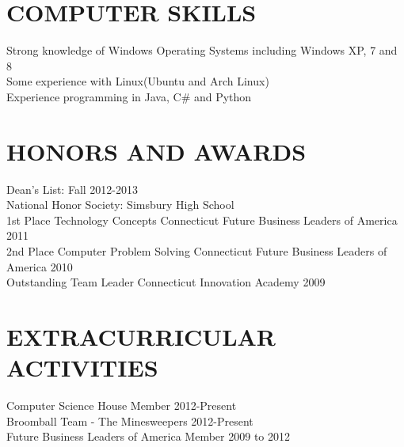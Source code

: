 \documentclass{res}
\begin{document}
\begin{resume}
\section{COMPUTER SKILLS}   
    \vspace{2pt}       
    Strong knowledge of Windows Operating Systems including Windows XP, 7 and 8\\
    Some experience with Linux(Ubuntu and Arch Linux) \\
    Experience programming in Java, C\# and Python\\
     
\section{HONORS AND AWARDS}          
    \vspace{2pt}
    Dean's List: Fall 2012-2013  \\        
    National Honor Society: Simsbury High School  \\        
    1st Place Technology Concepts Connecticut Future Business Leaders of America  2011\\        
    2nd Place Computer Problem Solving Connecticut Future Business Leaders of America 2010\\
    Outstanding Team Leader Connecticut Innovation Academy 2009
 
\section{EXTRACURRICULAR ACTIVITIES}        
    \vspace{2pt}
    Computer Science House Member 2012-Present \\  
    Broomball Team - The Minesweepers 2012-Present\\     
    Future Business Leaders of America Member 2009 to 2012   
 
\end{resume}
\end{document}
